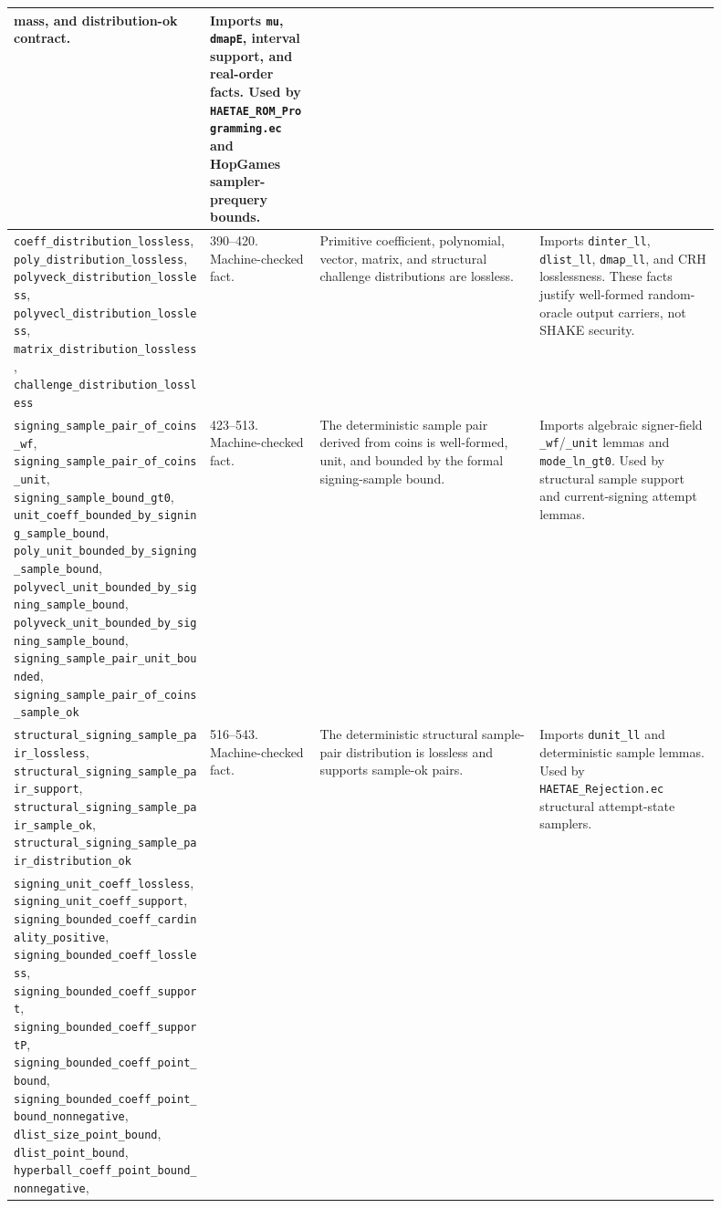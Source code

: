 \documentclass[11pt]{report}
\DeclareRobustCommand{\file}[1]{\ifmmode\text{\nolinkurl{#1}}\else\nolinkurl{#1}\fi}
\DeclareRobustCommand{\ec}[1]{\ifmmode\text{\nolinkurl{#1}}\else\nolinkurl{#1}\fi}
\theoremstyle{definition}
\theoremstyle{plain}
\begin{document}
{\begin{longtable}{p{0.25\linewidth}p{0.14\linewidth}p{0.28\linewidth}p{0.23\linewidth}}
mass, and distribution-ok contract. &
Imports \ec{mu}, \ec{dmapE}, interval support, and real-order facts.  Used by
\file{HAETAE\_ROM\_Programming.ec} and HopGames sampler-prequery bounds. \\
\midrule
\ec{coeff\_distribution\_lossless},
\ec{poly\_distribution\_lossless},
\ec{polyveck\_distribution\_lossless},
\ec{polyvecl\_distribution\_lossless},
\ec{matrix\_distribution\_lossless},
\ec{challenge\_distribution\_lossless} &
390--420. Machine-checked fact. &
Primitive coefficient, polynomial, vector, matrix, and structural challenge
distributions are lossless. &
Imports \ec{dinter\_ll}, \ec{dlist\_ll}, \ec{dmap\_ll}, and CRH
losslessness.  These facts justify well-formed random-oracle output carriers,
not SHAKE security. \\
\midrule
\ec{signing\_sample\_pair\_of\_coins\_wf},
\ec{signing\_sample\_pair\_of\_coins\_unit},
\ec{signing\_sample\_bound\_gt0},
\ec{unit\_coeff\_bounded\_by\_signing\_sample\_bound},
\ec{poly\_unit\_bounded\_by\_signing\_sample\_bound},
\ec{polyvecl\_unit\_bounded\_by\_signing\_sample\_bound},
\ec{polyveck\_unit\_bounded\_by\_signing\_sample\_bound},
\ec{signing\_sample\_pair\_unit\_bounded},
\ec{signing\_sample\_pair\_of\_coins\_sample\_ok} &
423--513. Machine-checked fact. &
The deterministic sample pair derived from coins is well-formed, unit, and
bounded by the formal signing-sample bound. &
Imports algebraic signer-field \ec{\_wf}/\ec{\_unit} lemmas and
\ec{mode\_ln\_gt0}.  Used by structural sample support and current-signing
attempt lemmas. \\
\midrule
\ec{structural\_signing\_sample\_pair\_lossless},
\ec{structural\_signing\_sample\_pair\_support},
\ec{structural\_signing\_sample\_pair\_sample\_ok},
\ec{structural\_signing\_sample\_pair\_distribution\_ok} &
516--543. Machine-checked fact. &
The deterministic structural sample-pair distribution is lossless and supports
sample-ok pairs. &
Imports \ec{dunit\_ll} and deterministic sample lemmas.  Used by
\file{HAETAE\_Rejection.ec} structural attempt-state samplers. \\
\midrule
\ec{signing\_unit\_coeff\_lossless},
\ec{signing\_unit\_coeff\_support},
\ec{signing\_bounded\_coeff\_cardinality\_positive},
\ec{signing\_bounded\_coeff\_lossless},
\ec{signing\_bounded\_coeff\_support},
\ec{signing\_bounded\_coeff\_supportP},
\ec{signing\_bounded\_coeff\_point\_bound},
\ec{signing\_bounded\_coeff\_point\_bound\_nonnegative},
\ec{dlist\_size\_point\_bound}, \ec{dlist\_point\_bound},
\ec{hyperball\_coeff\_point\_bound\_nonnegative},

\end{longtable}}
\end{document}
